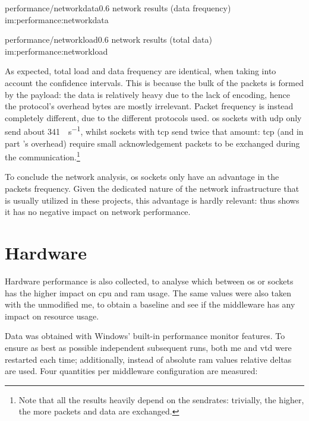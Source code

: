 \begin{image}
	{performance/networkdata}{0.6}
	{network results (data frequency)}
	{im:performance:networkdata}
	{}
\end{image}

\begin{image}
	{performance/networkload}{0.6}
	{network results (total data)}
	{im:performance:networkload}
	{}
\end{image}

As expected, total load and data frequency are identical, when taking into account the confidence intervals. This is because the bulk of the packets is formed by the payload: the data is relatively heavy due to the lack of encoding, hence the protocol's overhead bytes are mostly irrelevant. Packet frequency is instead completely different, due to the different protocols used. \gls{os} sockets with \gls{udp} only send about \SI{341}{\packets\per\second}, whilst  sockets with \gls{tcp} send twice that amount: \gls{tcp} (and in part 's overhead) require small acknowledgement packets to be exchanged during the communication.\footnote{Note that all the results heavily depend on the sendrates: trivially, the higher, the more packets and data are exchanged.}

To conclude the network analysis, \gls{os} sockets only have an advantage in the packets frequency. Given the dedicated nature of the network infrastructure that is usually utilized in these projects, this advantage is hardly relevant:  thus shows it has no negative impact on network performance.

\section{Hardware}\label{sc:performance:hardware}



Hardware performance is also collected, to analyse which between \gls{os} or  sockets has the higher impact on \gls{cpu} and \gls{ram} usage. The same values were also taken with the unmodified \gls{me}, to obtain a baseline and see if the \gls{middleware} has any impact on resource usage.

Data was obtained with Windows' built-in performance monitor features. To ensure as best as possible independent subsequent runs, both \gls{me} and \gls{vtd} were restarted each time; additionally, instead of absolute \gls{ram} values relative deltas are used. Four quantities per \gls{middleware} configuration are measured:


